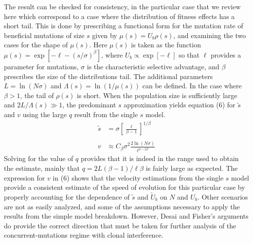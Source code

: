 \documentclass[12pt, one column]{article}
\begin{document}
The result can be checked for consistency, in the particular case that we review here which correspond to a case where the distribution of fitness effects has a short tail.  This is done by prescribing a functional form for the mutation rate of beneficial mutations of size $s$ given by $\mu(s)=U_b \rho(s)$, and examining the two cases for the shape of $\mu(s)$.  Here $\mu(s)$ is taken as the function $\mu(s) = \exp[-\ell - (s/\sigma)^\beta]$, where $U_b \propto \exp[-\ell]$ so that $\ell$ provides a parameter for mutations, $\sigma$ is the characteristic selective advantage, and $\beta $ prescribes the size of the distributions tail.  The additional parameters $L=\ln(N\sigma)$ and $\Lambda(s)= \ln(1/\mu(s))$ can be defined.  In the case where $\beta > 1$, the tail of $\rho(s)$ is short.  When the population size is sufficiently large and $2L/\Lambda(s)\gg 1$, the predominant $s$ approximation yields equation (6) for $\tilde{s}$ and $v$ using the large $q$ result from the single $s$ model.
\begin{equation}
\begin{aligned}
\tilde{s} &= \sigma\left[ \frac{\ell}{\beta-1} \right]^{1/\beta}\\
\\
v & \approx C_\beta \sigma^2 \frac{2 \ln(N\sigma)}{\ell^{2-2\beta}}
\end{aligned}
\end{equation}
Solving for the value of $q$ provides that it is indeed in the range used to obtain the estimate, mainly that $q=2L(\beta-1)/\ell \beta$ is fairly large as expected.  The expression for $v$ in (6) shows that the velocity estimations from the single $s$ model provide a consistent estimate of the speed of evolution for this particular case by properly accounting for the dependence of $\tilde{s}$ and $\tilde{U}_b$ on $N$ and $U_b$.  Other scenarios are not as easily analyzed, and some of the assumptions necessary to apply the results from the simple model breakdown. However, Desai and Fisher's arguments do provide the correct direction that must be taken for further analysis of the concurrent-mutations regime with clonal interference.
\end{document}
